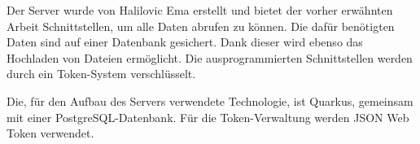 Der Server wurde von Halilovic Ema erstellt und bietet der vorher erwähnten Arbeit Schnittstellen, um alle Daten abrufen zu können. 
Die dafür benötigten Daten sind auf einer Datenbank gesichert. 
Dank dieser wird ebenso das Hochladen von Dateien ermöglicht.  
Die ausprogrammierten Schnittstellen werden durch ein Token-System verschlüsselt. 


Die, für den Aufbau des Servers verwendete Technologie, ist Quarkus, gemeinsam mit einer PostgreSQL-Datenbank.
Für die Token-Verwaltung werden JSON Web Token verwendet.

